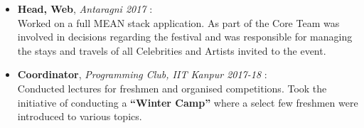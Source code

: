 
\begin{itemize}
\item \textbf{Head, Web}, \emph{Antaragni 2017}
  : \\
  Worked on a full MEAN stack application. As part of the Core Team was involved
  in decisions regarding the festival and was responsible for managing the stays
  and travels of all Celebrities and Artists invited to the event.
\item \textbf{Coordinator}, \emph{Programming Club, IIT Kanpur 2017-18}
  : \\
  Conducted lectures for freshmen and organised competitions. Took the
  initiative of conducting a \textbf{``Winter Camp''} where a select few
  freshmen were introduced to various topics.
\end{itemize}
